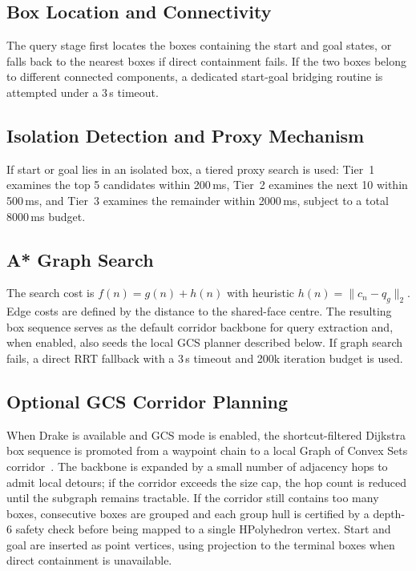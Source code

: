 \documentclass[journal]{IEEEtran}
\begin{document}
\subsection{Box Location and Connectivity}

The query stage first locates the boxes containing the start and goal
states, or falls back to the nearest boxes if direct containment fails.
If the two boxes belong to different connected components, a dedicated
start-goal bridging routine is attempted under a 3\,s timeout.

\subsection{Isolation Detection and Proxy Mechanism}

If start or goal lies in an isolated box, a tiered proxy search is used:
Tier~1 examines the top 5 candidates within 200\,ms, Tier~2 examines
the next 10 within 500\,ms, and Tier~3 examines the remainder within
2000\,ms, subject to a total 8000\,ms budget.

\subsection{A* Graph Search}

The search cost is
$f(n) = g(n) + h(n)$ with heuristic $h(n) = \|c_n - q_g\|_2$.
Edge costs are defined by the distance to the shared-face centre.
The resulting box sequence serves as the default corridor backbone for
query extraction and, when enabled, also seeds the local GCS planner
described below. If graph search fails, a direct RRT fallback with a
3\,s timeout and 200k iteration budget is used.

\subsection{Optional GCS Corridor Planning}

When Drake is available and GCS mode is enabled, the shortcut-filtered
Dijkstra box sequence is promoted from a waypoint chain to a local
Graph of Convex Sets corridor~\cite{marcucci2024motion}. The backbone is
expanded by a small number of adjacency hops to admit local detours;
if the corridor exceeds the size cap, the hop count is reduced until
the subgraph remains tractable. If the corridor still contains too many
boxes, consecutive boxes are grouped and each group hull is certified by
a depth-6 safety check before being mapped to a single HPolyhedron
vertex. Start and goal are inserted as point vertices, using projection
to the terminal boxes when direct containment is unavailable.
\end{document}
